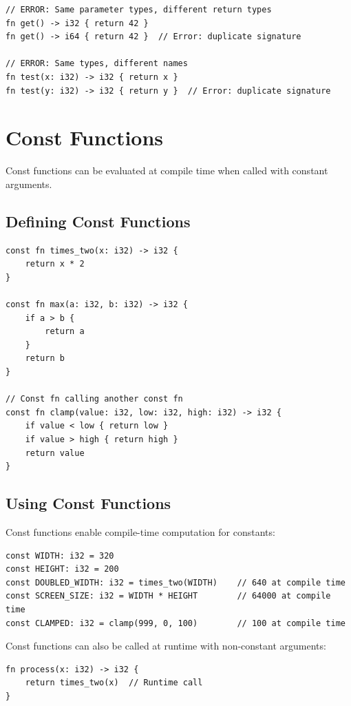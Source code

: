 \begin{lstlisting}
// ERROR: Same parameter types, different return types
fn get() -> i32 { return 42 }
fn get() -> i64 { return 42 }  // Error: duplicate signature

// ERROR: Same types, different names
fn test(x: i32) -> i32 { return x }
fn test(y: i32) -> i32 { return y }  // Error: duplicate signature
\end{lstlisting}

\section{Const Functions}
\label{sec:const-fn}

Const functions can be evaluated at compile time when called with constant arguments.

\subsection{Defining Const Functions}
\label{subsec:const-fn-def}

\begin{lstlisting}
const fn times_two(x: i32) -> i32 {
    return x * 2
}

const fn max(a: i32, b: i32) -> i32 {
    if a > b {
        return a
    }
    return b
}

// Const fn calling another const fn
const fn clamp(value: i32, low: i32, high: i32) -> i32 {
    if value < low { return low }
    if value > high { return high }
    return value
}
\end{lstlisting}

\subsection{Using Const Functions}
\label{subsec:const-fn-use}

Const functions enable compile-time computation for constants:

\begin{lstlisting}
const WIDTH: i32 = 320
const HEIGHT: i32 = 200
const DOUBLED_WIDTH: i32 = times_two(WIDTH)    // 640 at compile time
const SCREEN_SIZE: i32 = WIDTH * HEIGHT        // 64000 at compile time
const CLAMPED: i32 = clamp(999, 0, 100)        // 100 at compile time
\end{lstlisting}

Const functions can also be called at runtime with non-constant arguments:

\begin{lstlisting}
fn process(x: i32) -> i32 {
    return times_two(x)  // Runtime call
}
\end{lstlisting}

